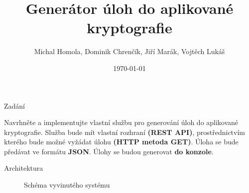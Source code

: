\documentclass[aspectratio=1610]{beamer}
\title[Generátor úloh do aplikované kryptografie]
{Generátor úloh do aplikované kryptografie}
\author[ Homola, Chrenčík, Marák, Lukáš]
{Michal Homola, Dominik Chrenčík, Jiří Marák, Vojtěch Lukáš}
\institute
{MPC-KRY \\
Ústav telekomunikací  \\
VUT v Brně
}
\date{\today}
\begin{document}

\begin{frame}
    \titlepage
\end{frame}


\begin{frame}{Zadání}
    \begin{alertblock}{}
        Navrhněte a implementujte vlastní službu pro generování úloh do aplikované kryptografie. Služba bude mít vlastní rozhraní \textbf{(REST API)}, prostřednictvím kterého bude možné vyžádat úlohu \textbf{(HTTP metoda GET)}. Úloha se bude předávat ve formátu \textbf{JSON}. Úlohy se budou generovat \textbf{do konzole}. 
    \end{alertblock}
\end{frame}

\begin{frame}{Architektura}
    \begin{figure}
        \centering
        
        
        \caption{Schéma vyvinutého systému}
    \end{figure}
\end{frame}

\end{document}
